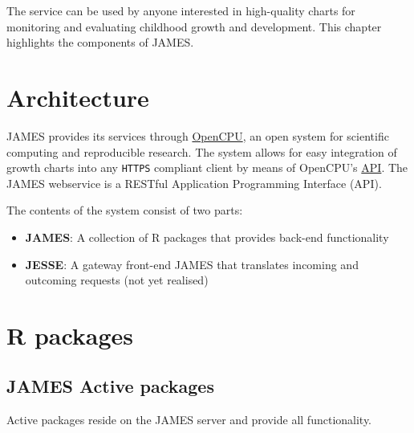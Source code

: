 \documentclass[
]{book}
\providecommand{\tightlist}{%
  \setlength{\itemsep}{0pt}\setlength{\parskip}{0pt}}
\begin{document}
The service can be used by anyone interested in high-quality charts for monitoring and evaluating childhood growth and development. This chapter highlights the components of JAMES.

\hypertarget{architecture}{%
\section{Architecture}\label{architecture}}

JAMES provides its services through \href{https://www.opencpu.org}{OpenCPU}, an open system for scientific computing and reproducible research. The system allows for easy integration of growth charts into any \texttt{HTTPS} compliant client by means of OpenCPU's \href{https://www.opencpu.org/api.html}{API}. The JAMES webservice is a RESTful Application Programming Interface (API).

The contents of the system consist of two parts:

\begin{itemize}
\tightlist
\item
  \textbf{JAMES}: A collection of R packages that provides back-end functionality
\item
  \textbf{JESSE}: A gateway front-end JAMES that translates incoming and outcoming requests (not yet realised)
\end{itemize}

\hypertarget{r-packages}{%
\section{R packages}\label{r-packages}}

\hypertarget{james-active-packages}{%
\subsection{JAMES Active packages}\label{james-active-packages}}

Active packages reside on the JAMES server and provide all functionality.
\end{document}
